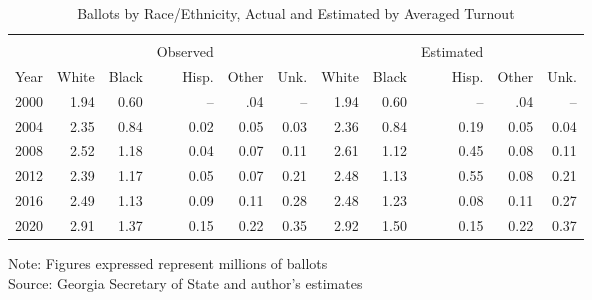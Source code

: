 \begin{table}[ht]
\small
\centering
\begin{threeparttable}
\caption{Ballots by Race/Ethnicity, Actual and Estimated by Averaged Turnout}  
\label{tab:constant-reg-to}
\begin{tabular}{rrrrrr|rrrrr}
 \hline \\ \vspace{0.5em}
   &  &  &Observed  &  &  &  &  & Estimated &  & \\    \hline  
  Year & White & Black & Hisp. & Other & Unk. & White & Black & Hisp. & Other & Unk.  \\
  \hline
 2000 & 1.94 & 0.60 & -- &.04 & --&1.94 & 0.60 & -- & .04 & --   \\ 
   2004 & 2.35& 0.84 & 0.02 & 0.05 & 0.03 & 2.36 & 0.84 & 0.19 & 0.05 & 0.04 \\ 
   2008 & 2.52 & 1.18& 0.04 & 0.07 & 0.11 & 2.61 & 1.12 & 0.45 & 0.08 & 0.11 \\ 
   2012 & 2.39& 1.17 & 0.05 & 0.07 & 0.21 & 2.48 & 1.13 & 0.55 & 0.08 & 0.21 \\ 
   2016 & 2.49& 1.13 & 0.09 & 0.11 & 0.28 & 2.48 & 1.23 & 0.08 & 0.11 & 0.27 \\ 
   2020 & 2.91 & 1.37 & 0.15 & 0.22 & 0.35 & 2.92 & 1.50 & 0.15 & 0.22 & 0.37\vspace{0.5em}\\ 
   \hline
\end{tabular}
{\footnotesize Note: Figures expressed represent millions of ballots}\\
{\footnotesize Source: Georgia Secretary of State and author's estimates}
\end{threeparttable}
\end{table}



